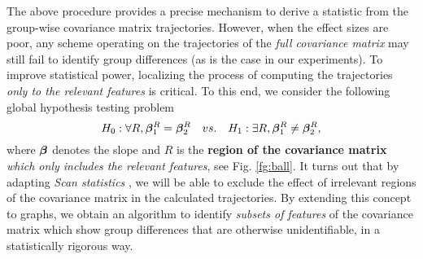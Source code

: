 
The above procedure provides a precise mechanism to derive a statistic from the group-wise covariance matrix trajectories.
However, when the effect sizes are poor, any scheme operating on 
the trajectories of the {\em full covariance matrix} may still fail to identify group differences (as is the case in our experiments). To improve statistical power, localizing the process of computing the trajectories {\em 
  only to the relevant features} is critical. 
%
%
To this end, we consider the following global hypothesis testing problem
\begin{equation*}
H_0: \forall R, \bm{\beta}_1^R=\bm{\beta}_2^R \quad vs. \quad H_1: \exists R, \bm{\beta}_1^R\ne\bm{\beta}_2^R,
\end{equation*}       
where $\bm{\beta}$ denotes the slope and $R$ is the \textbf{region of the covariance matrix}
{\em which only includes the relevant features}, see Fig. \ref{fg:ball}.
It turns out that by adapting {\em Scan statistics} \citep{fan2012control, arias2011detection}, we will be able to exclude the effect of irrelevant regions of the covariance 
matrix in the calculated trajectories. 
By extending this concept to graphs, we obtain an algorithm to identify {\em subsets of features} of the covariance matrix which show group differences that 
are otherwise unidentifiable, in a statistically rigorous way. 

